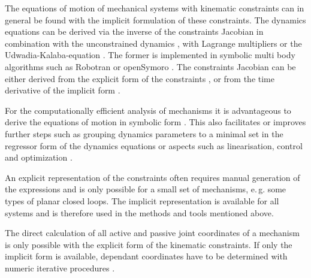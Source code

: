 \documentclass[twocolumn,10pt]{IFTOMM}
\begin{document}
The equations of motion of mechanical systems with kinematic constraints can in general be found with the implicit formulation of these constraints.
The dynamics equations can be derived via the inverse of the constraints Jacobian in combination with the unconstrained dynamics \cite{NakamuraGho1989}, with Lagrange multipliers \cite{LuhZhe1985} or the Udwadia-Kalaba-equation \cite{UdwadiaKal1992}.
The former is implemented in symbolic multi body algorithms such as Robotran \cite{SaminFis2013} or openSymoro \cite{KhalilVijKhoMuk2014}.
The constraints Jacobian can be either derived from the explicit form of the constraints \cite{NakamuraGho1989}, or from the time derivative of the implicit form \cite{ParkChoPlo1999}.

For the computationally efficient analysis of mechanisms it is advantageous to derive the equations of motion in symbolic form \cite{SaminFis2013}.
This also facilitates or improves further steps such as grouping dynamics parameters to a minimal set  in the regressor form of the dynamics equations \cite{KhalilBen1995} or aspects such as linearisation, control and optimization \cite{ParkChoPlo1999}.


An explicit representation of the constraints often requires manual generation of the expressions and is only possible for a small set of mechanisms, e.\,g. some types of planar closed loops.
The implicit representation is available for all systems and is therefore used in the methods and tools mentioned above.


The direct calculation of all active and passive joint coordinates of a mechanism is only possible with the explicit form of the kinematic constraints.
If only the implicit form is available, dependant coordinates have to be determined with numeric iterative procedures \cite{ParkChoPlo1999}.
\end{document}
